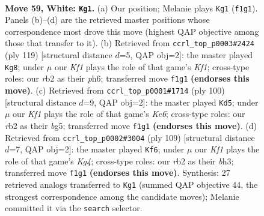 \documentclass[11pt]{article}
\begin{document}
\clearpage

\begin{figure}[p]\centering
\begin{subfigure}{0.46\textwidth}\centering
\resizebox{\linewidth}{!}{%
\newchessgame
\chessboard[
  setfen={7k/8/8/4p1p1/5p2/5B2/1r6/5K2 w - - 29 59},
  showmover=false,
  pgfstyle=straightmove, color=movearrow, markmove={f1-g1}
]}
\caption{}
\end{subfigure}\hfill
\begin{subfigure}{0.46\textwidth}\centering
\resizebox{\linewidth}{!}{%
\newchessgame
\chessboard[
  setfen={5k2/8/4K2P/6P1/5P2/8/1b6/8 b - - 0 60},
  showmover=false,
  pgfstyle=straightmove, color=movearrow, markmove={f8-g8}
]}
\caption{}
\end{subfigure}
\\[4pt]
\begin{subfigure}{0.46\textwidth}\centering
\resizebox{\linewidth}{!}{%
\newchessgame
\chessboard[
  setfen={8/7k/4K3/1p4b1/2pB4/8/8/8 w - - 6 51},
  showmover=false,
  pgfstyle=straightmove, color=movearrow, markmove={e6-d5}
]}
\caption{}
\end{subfigure}\hfill
\begin{subfigure}{0.46\textwidth}\centering
\resizebox{\linewidth}{!}{%
\newchessgame
\chessboard[
  setfen={8/8/1b1p4/1P1P2k1/2P5/5K1B/8/8 b - - 0 55},
  showmover=false,
  pgfstyle=straightmove, color=movearrow, markmove={g5-f6}
]}
\caption{}
\end{subfigure}
\caption{\textbf{Move 59, White: \texttt{Kg1}.} (a) Our position; Melanie plays \texttt{Kg1} (\texttt{f1g1}). Panels (b)--(d) are the retrieved master positions whose correspondence most drove this move (highest QAP objective among those that transfer to it). (b) Retrieved from \texttt{ccrl\_top\_p0003\#2424} (ply 119) [structural distance $d$=5, QAP obj=2]: the master played \texttt{Kg8}; under $\mu$ our \emph{Kf1} plays the role of that game's \emph{Kf1}; cross-type roles: our \emph{r}b2 as their \emph{p}h6; transferred move \texttt{f1g1} \textbf{(endorses this move)}. (c) Retrieved from \texttt{ccrl\_top\_p0001\#1714} (ply 100) [structural distance $d$=9, QAP obj=2]: the master played \texttt{Kd5}; under $\mu$ our \emph{Kf1} plays the role of that game's \emph{Ke6}; cross-type roles: our \emph{r}b2 as their \emph{b}g5; transferred move \texttt{f1g1} \textbf{(endorses this move)}. (d) Retrieved from \texttt{ccrl\_top\_p0002\#3004} (ply 109) [structural distance $d$=7, QAP obj=2]: the master played \texttt{Kf6}; under $\mu$ our \emph{Kf1} plays the role of that game's \emph{Kg4}; cross-type roles: our \emph{r}b2 as their \emph{b}h3; transferred move \texttt{f1g1} \textbf{(endorses this move)}. Synthesis: 27 retrieved analogs transferred to \texttt{Kg1} (summed QAP objective 44, the strongest correspondence among the candidate moves); Melanie committed it via the \texttt{search} selector.}
\label{fig:thought-m116}
\end{figure}
\end{document}
